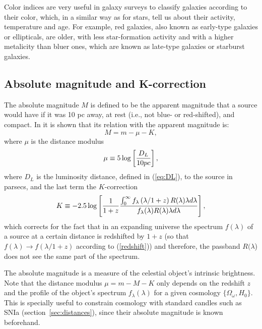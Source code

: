 Color indices are very useful in galaxy surveys to classify galaxies according to their color, which, in a similar way as for stars, tell us about their activity, temperature and age. For example, red galaxies, also known as early-type galaxies or ellipticals, are older, with less star-formation activity and with a higher metalicity than bluer ones, which are known as late-type galaxies or starburst galaxies.

\subsection{Absolute magnitude and K-correction}
\label{sec:absolute_mag}
The absolute magnitude $M$ is defined to be the apparent magnitude that a source would have if it was 10 pc away, at rest (i.e., not blue- or red-shifted), and compact. In \citet{Hogg1996} it is shown that its relation with the apparent magnitude is:
\begin{equation}
M = m - \mu - K,
\end{equation}
where $\mu$ is the distance modulus 
\begin{equation}
\mu \equiv 5 \log \left[{D_L \over 10pc} \right],
\end{equation}
where $D_L$ is the luminosity distance, defined in (\ref{eq:DL}), to the source in parsecs, and the last term the $K$-correction 
\begin{equation}
K \equiv -2.5 \log \left[{1 \over 1+z}{\int^{\infty}_{0} f_\lambda \left( \lambda / 1+z \right)R(\lambda)\lambda d\lambda \over f_\lambda(\lambda)R(\lambda)\lambda d\lambda}\right], 
\end{equation}
which corrects for the fact that in an expanding universe the spectrum $f(\lambda)$ of a source at a certain distance is redshifted by $1+z$ (so that $f(\lambda) \rightarrow f(\lambda/1+z)$ according to (\ref{redshift})) and therefore, the passband $R(\lambda$) does not see the same part of the spectrum.

The absolute magnitude is a measure of the celestial object's intrinsic brightness. Note that the distance modulus $\mu = m - M - K$ only depends on the redshift $z$ and the profile of the object's spectrum $f_\lambda(\lambda)$ for a given cosmology $\lbrace \Omega_\omega, H_0 \rbrace$. This is specially useful to constrain cosmology with standard candles such as SNIa (section~\ref{sec:distances}), since their absolute magnitude is known beforehand.

